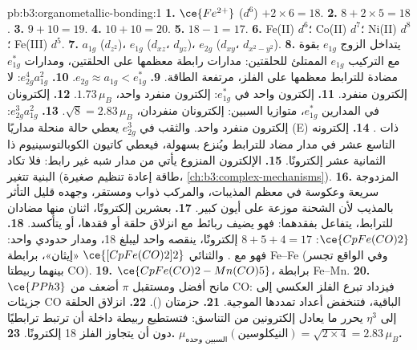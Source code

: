 \begin{solution}{pb:b3:organometallic-bonding:1}
\textbf{1.} $\ce{Fe^{2+}}$ ($d^6$) $+ 2 \times 6 = 18$.
\textbf{2.} $8 + 2 \times 5 = 18$.
\textbf{3.} $9 + 10 = 19$.
\textbf{4.} $10 + 10 = 20$.
\textbf{5.} $18 - 1 = 17$.
\textbf{6.} Fe(II) $d^6$؛ Co(II) $d^7$؛ Ni(II) $d^8$؛ Fe(III) $d^5$.
\textbf{7.} $a_{1g}$ ($d_{z^2}$)، $e_{1g}$ ($d_{xz}$، $d_{yz}$)، $e_{2g}$ ($d_{xy}$، $d_{x^2-y^2}$).
\textbf{8.} يتداخل الزوج $e_{1g}$ بقوة مع التركيب $e_{1g}$ الممتلئ للحلقتين: مدارات رابطة
معظمها على الحلقتين، ومدارات $e_{1g}^\ast$ مضادة للترابط معظمها على الفلز، مرتفعة
الطاقة.
\textbf{9.} $e_{2g} \approx a_{1g} < e_{1g}^\ast$.
\textbf{10.} $e_{2g}^4a_{1g}^2$: لا إلكترون منفرد.
\textbf{11.} إلكترون واحد في $e_{1g}^\ast$: إلكترون منفرد واحد، $1.73\,\mu_B$.
\textbf{12.} إلكترونان في المدارين $e_{1g}^\ast$، متوازيا السبين: إلكترونان منفردان، $\sqrt{8} =
2.83\,\mu_B$.
\textbf{13.} $e_{2g}^3a_{1g}^2$: إلكترون منفرد واحد. والثقب في $e_{2g}^3$ يعطي حالة منحلة مداريًا
(E) ذات .
\textbf{14.} إلكترونه التاسع عشر في مدار مضاد للترابط ويُنزع بسهولة،
فيعطي كاتيون الكوبالتوسينيوم ذا الثمانية عشر إلكترونًا.
\textbf{15.} الإلكترون المنزوع يأتي من مدار شبه غير رابط: فلا تكاد
البنية تتغير (طاقة إعادة تنظيم صغيرة، \cref{ch:b3:complex-mechanisms}).
\textbf{16.} المزدوجة سريعة وعكوسة في معظم المذيبات، والمركب
ذواب ومستقر، وجهده قليل التأثر بالمذيب لأن
الشحنة موزعة على أيون كبير.
\textbf{17.} بعشرين إلكترونًا، اثنان منها مضادان للترابط، يتفاعل بفقدهما: فهو
يضيف ربائط مع انزلاق حلقة أو فقدها، أو يتأكسد.
\textbf{18.} $\ce{CpFe(CO)2}$: $8 + 5 + 4 = 17$ إلكترونًا، ينقصه واحد ليبلغ 18، ومدار حدودي واحد: فهو 
مع . والثنائي $\ce{[CpFe(CO)2]2}$ «إيثان»، برابطة Fe--Fe (وفي الواقع تجسر بينهما ربيطتا
CO).
\textbf{19.} $\ce{CpFe(CO)2-Mn(CO)5}$، برابطة Fe--Mn.
\textbf{20.} $\ce{PPh3}$ مانح أفضل ومستقبل $\pi$ أضعف من CO: فيزداد تبرع الفلز العكسي
إلى جزيئات CO الباقية، فتنخفض أعداد تمددها الموجية.
\textbf{21.} حزمتان ().
\textbf{22.} انزلاق الحلقة إلى $\eta^3$ يحرر ما يعادل إلكترونين من التناسق: فتستطيع ربيطة
داخلة أن ترتبط ترابطيًا دون أن يتجاوز الفلز 18 إلكترونًا.
\textbf{23.} \textbf{$\mu_{\text{السبين وحده}}(\text{النيكلوسين}) = \sqrt{2 \times 4} = 2.83\,\mu_B$.}
\end{solution}
